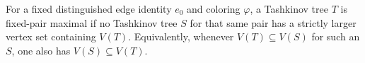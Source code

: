 \begin{definition}
For a fixed distinguished edge identity $e_0$ and coloring $\varphi$, a
Tashkinov tree $T$ is fixed-pair maximal if no Tashkinov tree $S$ for that
same pair has a strictly larger vertex set containing $V(T)$.  Equivalently,
whenever $V(T)\subseteq V(S)$ for such an $S$, one also has
$V(S)\subseteq V(T)$.
\end{definition}
